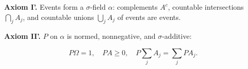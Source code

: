 \textbf{Axiom I'.} Events form a $\sigma$-field $\alpha$: complements $A^c$, countable intersections $\bigcap_j A_j$, and countable unions $\bigcup_j A_j$ of events are events.

\textbf{Axiom II'.} $P$ on $\alpha$ is normed, nonnegative, and $\sigma$-additive:

$$P\Omega = 1, \quad PA \geq 0, \quad P \sum_{j} A_j = \sum_{j} PA_j.$$
